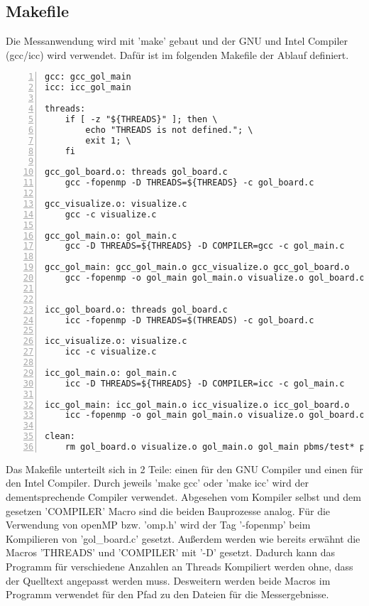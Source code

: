 \documentclass[plainarticle,zihtitle,german,final,hyperref,utf8]{zihpub}
\begin{document}
\subsection{Makefile}\label{sec:Makefile}
Die Messanwendung wird mit 'make' gebaut und der GNU und Intel Compiler (gcc/icc) wird verwendet. Dafür ist im folgenden Makefile der Ablauf definiert.
\begin{lstlisting}[numbers=left]
gcc: gcc_gol_main
icc: icc_gol_main

threads:
	if [ -z "${THREADS}" ]; then \
		echo "THREADS is not defined."; \
		exit 1; \
	fi

gcc_gol_board.o: threads gol_board.c
	gcc -fopenmp -D THREADS=${THREADS} -c gol_board.c

gcc_visualize.o: visualize.c
	gcc -c visualize.c

gcc_gol_main.o: gol_main.c
	gcc -D THREADS=${THREADS} -D COMPILER=gcc -c gol_main.c

gcc_gol_main: gcc_gol_main.o gcc_visualize.o gcc_gol_board.o
	gcc -fopenmp -o gol_main gol_main.o visualize.o gol_board.o


icc_gol_board.o: threads gol_board.c
	icc -fopenmp -D THREADS=$(THREADS) -c gol_board.c

icc_visualize.o: visualize.c
	icc -c visualize.c

icc_gol_main.o: gol_main.c
	icc -D THREADS=${THREADS} -D COMPILER=icc -c gol_main.c

icc_gol_main: icc_gol_main.o icc_visualize.o icc_gol_board.o
	icc -fopenmp -o gol_main gol_main.o visualize.o gol_board.o

clean:
	rm gol_board.o visualize.o gol_main.o gol_main pbms/test* pbms/*.gif pbms/foo* pbms/*.mkv
\end{lstlisting}

Das Makefile unterteilt sich in 2 Teile: einen für den GNU Compiler und einen für den Intel Compiler. Durch jeweils 'make gcc' oder 'make icc' wird der dementsprechende Compiler verwendet.\newline
Abgesehen vom Kompiler selbst und dem gesetzen 'COMPILER' Macro sind die beiden Bauprozesse analog. Für die Verwendung von openMP bzw. 'omp.h' wird der Tag '-fopenmp' beim Kompilieren von 'gol\_board.c' gesetzt. Außerdem werden wie bereits erwähnt die Macros 'THREADS' und 'COMPILER' mit '-D' gesetzt. Dadurch kann das Programm für verschiedene Anzahlen an Threads Kompiliert werden ohne, dass der Quelltext angepasst werden muss. Desweitern werden beide Macros im Programm verwendet für den Pfad zu den Dateien für die Messergebnisse.
\end{document}
